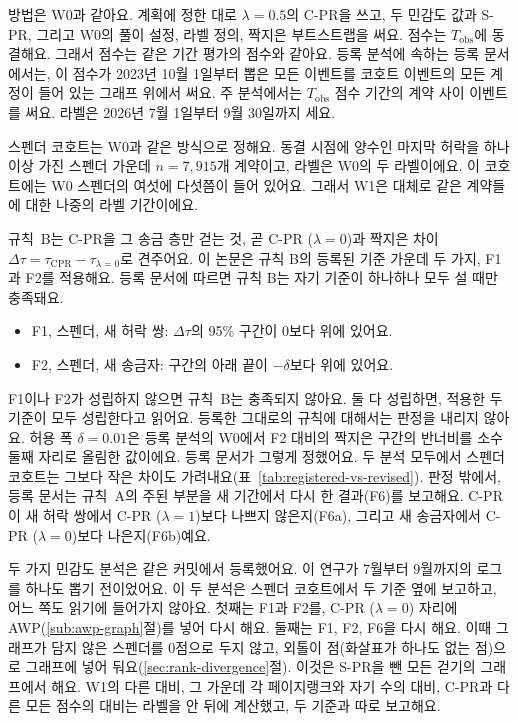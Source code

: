 방법은 W0과 같아요. 계획에 정한 대로 $\lambda=0.5$의 \mbox{C-PR}을 쓰고, 두 민감도 값과 \mbox{S-PR}, 그리고 W0의 풀이 설정, 라벨 정의, 짝지은 부트스트랩을 써요. 점수는 $T_{\mathrm{obs}}$에 동결해요. 그래서 점수는 같은 기간 평가의 점수와 같아요. 등록 분석에 속하는 등록 문서에서는, 이 점수가 2023년 10월 1일부터 뽑은 모든 이벤트를 코호트 이벤트의 모든 계정이 들어 있는 그래프 위에서 써요. 주 분석에서는 $T_{\mathrm{obs}}$ 점수 기간의 계약 사이 이벤트를 써요. 라벨은 2026년 7월 1일부터 9월 30일까지 세요.

스펜더 코호트는 W0과 같은 방식으로 정해요. 동결 시점에 양수인 마지막 허락을 하나 이상 가진 스펜더 가운데 $n=7{,}915$개 계약이고, 라벨은 W0의 두 라벨이에요. 이 코호트에는 W0 스펜더의 여섯에 다섯쯤이 들어 있어요. 그래서 W1은 대체로 같은 계약들에 대한 나중의 라벨 기간이에요.

규칙~B는 \mbox{C-PR}을 그 송금 층만 걷는 것, 곧 \mbox{C-PR} ($\lambda=0$)과 짝지은 차이 $\Delta\tau=\tau_{\mathrm{CPR}}-\tau_{\lambda=0}$로 견주어요. 이 논문은 규칙 B의 등록된 기준 가운데 두 가지, F1과 F2를 적용해요. 등록 문서에 따르면 규칙 B는 자기 기준이 하나하나 모두 설 때만 충족돼요.
\begin{itemize}
\item F1, 스펜더, 새 허락 쌍: $\Delta\tau$의 95\% 구간이 0보다 위에 있어요.
\item F2, 스펜더, 새 송금자: 구간의 아래 끝이 $-\delta$보다 위에 있어요.
\end{itemize}
F1이나 F2가 성립하지 않으면 규칙~B는 충족되지 않아요. 둘 다 성립하면, 적용한 두 기준이 모두 성립한다고 읽어요. 등록한 그대로의 규칙에 대해서는 판정을 내리지 않아요. 허용 폭 $\delta=0.01$은 등록 분석의 W0에서 F2 대비의 짝지은 구간의 반너비를 소수 둘째 자리로 올림한 값이에요. 등록 문서가 그렇게 정했어요. 두 분석 모두에서 스펜더 코호트는 그보다 작은 차이도 가려내요(표~\ref{tab:registered-vs-revised}). 판정 밖에서, 등록 문서는 규칙~A의 주된 부분을 새 기간에서 다시 한 결과(F6)를 보고해요. \mbox{C-PR}이 새 허락 쌍에서 \mbox{C-PR} ($\lambda=1$)보다 나쁘지 않은지(F6a), 그리고 새 송금자에서 \mbox{C-PR} ($\lambda=0$)보다 나은지(F6b)예요.

두 가지 민감도 분석은 같은 커밋에서 등록했어요. 이 연구가 7월부터 9월까지의 로그를 하나도 뽑기 전이었어요. 이 두 분석은 스펜더 코호트에서 두 기준 옆에 보고하고, 어느 쪽도 읽기에 들어가지 않아요. 첫째는 F1과 F2를, \mbox{C-PR} ($\lambda=0$) 자리에 AWP(\ref{sub:awp-graph}절)를 넣어 다시 해요. 둘째는 F1, F2, F6을 다시 해요. 이때 그래프가 담지 않은 스펜더를 0점으로 두지 않고, 외톨이 점(화살표가 하나도 없는 점)으로 그래프에 넣어 둬요(\ref{sec:rank-divergence}절). 이것은 \mbox{S-PR}을 뺀 모든 걷기의 그래프에서 해요. W1의 다른 대비, 그 가운데 각 페이지랭크와 자기 수의 대비, \mbox{C-PR}과 다른 모든 점수의 대비는 라벨을 안 뒤에 계산했고, 두 기준과 따로 보고해요.

